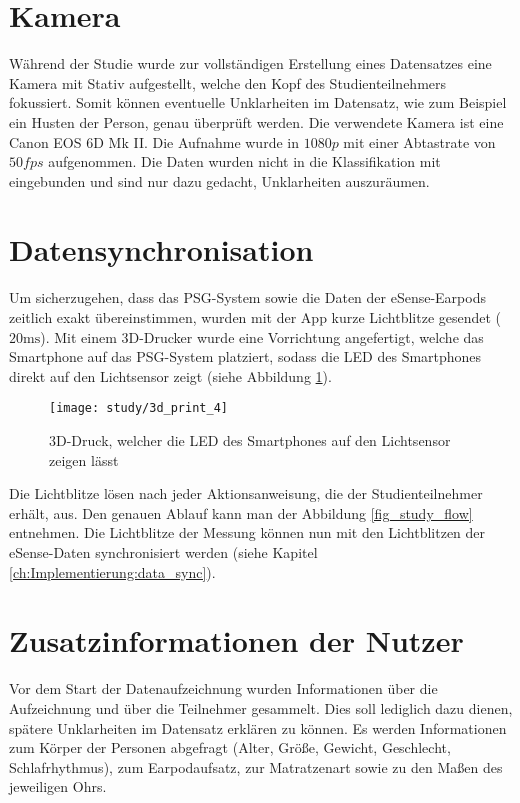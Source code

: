 \section{Kamera}
\label{ch:sa:camera}
Während der Studie wurde zur vollständigen Erstellung eines Datensatzes eine Kamera mit Stativ aufgestellt, welche den Kopf des Studienteilnehmers fokussiert. 
Somit können eventuelle Unklarheiten im Datensatz, wie zum Beispiel ein Husten der Person, genau überprüft werden. 
Die verwendete Kamera ist eine \glqq Canon EOS 6D Mk II\grqq.
Die Aufnahme wurde in $1080p$ mit einer Abtastrate von $50fps$ aufgenommen.
Die Daten wurden nicht in die Klassifikation mit eingebunden und sind nur dazu gedacht, Unklarheiten auszuräumen.

\section{Datensynchronisation}
\label{ch:sa:data_synchronisation}
Um sicherzugehen, dass das PSG-System sowie die Daten der eSense-Earpods zeitlich exakt übereinstimmen, wurden mit der App kurze Lichtblitze gesendet ($20 \si{\ms}$).
Mit einem 3D-Drucker wurde eine Vorrichtung angefertigt, welche das Smartphone auf das PSG-System platziert, sodass die LED des Smartphones direkt auf den Lichtsensor zeigt (siehe Abbildung \ref{study:3d_print}).

\begin{figure}[ht]
    \centering
    \texttt{[image: study/3d\_print\_4]}
    \caption{3D-Druck, welcher die LED des Smartphones auf den Lichtsensor zeigen lässt}
    \label{study:3d_print}
  \end{figure}

Die Lichtblitze lösen nach jeder Aktionsanweisung, die der Studienteilnehmer erhält, aus. 
Den genauen Ablauf kann man der Abbildung \ref{fig_study_flow} entnehmen.
Die Lichtblitze der Messung können nun mit den Lichtblitzen der eSense-Daten synchronisiert werden (siehe Kapitel \ref{ch:Implementierung:data_sync}).

\section{Zusatzinformationen der Nutzer}
\label{ch:sa:additionalUserStudiesInformation}
Vor dem Start der Datenaufzeichnung wurden Informationen über die Aufzeichnung und über die Teilnehmer gesammelt. 
Dies soll lediglich dazu dienen, spätere Unklarheiten im Datensatz erklären zu können.
Es werden Informationen zum Körper der Personen abgefragt (Alter, Größe, Gewicht, Geschlecht, Schlafrhythmus), zum Earpodaufsatz, zur Matratzenart sowie zu den Maßen des jeweiligen Ohrs.

